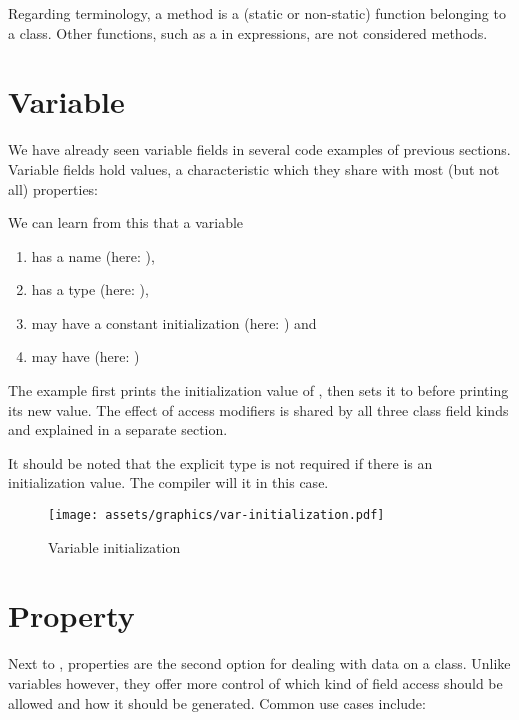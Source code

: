 \documentclass{haxe}
\begin{document}
Regarding terminology, a method is a (static or non-static) function belonging to a class. Other functions, such as a  in expressions, are not considered methods.


\section{Variable}
\label{class-field-variable}

We have already seen variable fields in several code examples of previous sections. Variable fields hold values, a characteristic which they share with most (but not all) properties:

We can learn from this that a variable

\begin{enumerate}
	\item has a name (here: ),
	\item has a type (here: ),
	\item may have a constant initialization (here: ) and
	\item may have  (here: )
\end{enumerate}

The example first prints the initialization value of , then sets it to  before printing its new value. The effect of access modifiers is shared by all three class field kinds and explained in a separate section.

It should be noted that the explicit type is not required if there is an initialization value. The compiler will  it in this case.

\begin{figure}
	\centering
	\texttt{[image: assets/graphics/var-initialization.pdf]}
	\caption{Variable initialization}
\end{figure}


\section{Property}
\label{class-field-property}

Next to , properties are the second option for dealing with data on a class. Unlike variables however, they offer more control of which kind of field access should be allowed and how it should be generated. Common use cases include:
\end{document}
